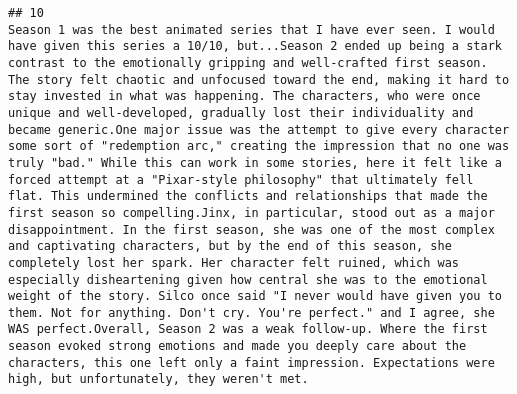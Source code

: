 \documentclass[
]{article}
\begin{document}
\begin{verbatim}
## 10                                                                                                                                                                                                                                                                                                                                                                                                                                                                                                                                                                                                                                                                                                                                                                                                                                                                                                                                                                                                                                                                                                                                                                                                                                                                                                                                                                                                                                                                                                                                Season 1 was the best animated series that I have ever seen. I would have given this series a 10/10, but...Season 2 ended up being a stark contrast to the emotionally gripping and well-crafted first season. The story felt chaotic and unfocused toward the end, making it hard to stay invested in what was happening. The characters, who were once unique and well-developed, gradually lost their individuality and became generic.One major issue was the attempt to give every character some sort of "redemption arc," creating the impression that no one was truly "bad." While this can work in some stories, here it felt like a forced attempt at a "Pixar-style philosophy" that ultimately fell flat. This undermined the conflicts and relationships that made the first season so compelling.Jinx, in particular, stood out as a major disappointment. In the first season, she was one of the most complex and captivating characters, but by the end of this season, she completely lost her spark. Her character felt ruined, which was especially disheartening given how central she was to the emotional weight of the story. Silco once said "I never would have given you to them. Not for anything. Don't cry. You're perfect." and I agree, she WAS perfect.Overall, Season 2 was a weak follow-up. Where the first season evoked strong emotions and made you deeply care about the characters, this one left only a faint impression. Expectations were high, but unfortunately, they weren't met.

\end{verbatim}
\end{document}
